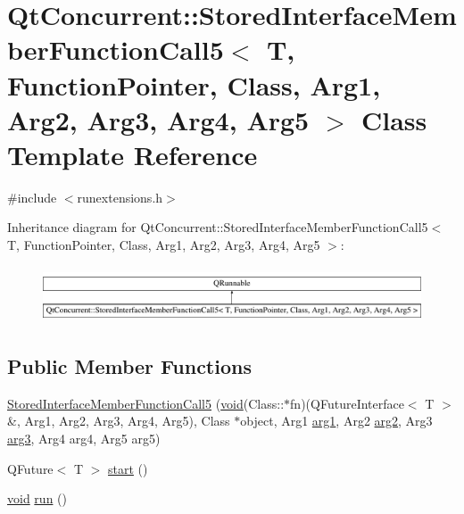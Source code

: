 \hypertarget{class_qt_concurrent_1_1_stored_interface_member_function_call5}{\section{Qt\-Concurrent\-:\-:Stored\-Interface\-Member\-Function\-Call5$<$ T, Function\-Pointer, Class, Arg1, Arg2, Arg3, Arg4, Arg5 $>$ Class Template Reference}
\label{class_qt_concurrent_1_1_stored_interface_member_function_call5}
}


{\ttfamily \#include $<$runextensions.\-h$>$}

Inheritance diagram for Qt\-Concurrent\-:\-:Stored\-Interface\-Member\-Function\-Call5$<$ T, Function\-Pointer, Class, Arg1, Arg2, Arg3, Arg4, Arg5 $>$\-:\begin{figure}[H]
\begin{center}
\leavevmode
\includegraphics[height=1.676647cm]{class_qt_concurrent_1_1_stored_interface_member_function_call5}
\end{center}
\end{figure}
\subsection*{Public Member Functions}
\begin{DoxyCompactItemize}
\item 
\hyperlink{class_qt_concurrent_1_1_stored_interface_member_function_call5_aa9068fc355a02ff4a4d4ac9f72644d60}{Stored\-Interface\-Member\-Function\-Call5} (\hyperlink{group___u_a_v_objects_plugin_ga444cf2ff3f0ecbe028adce838d373f5c}{void}(Class\-::$\ast$fn)(Q\-Future\-Interface$<$ T $>$ \&, Arg1, Arg2, Arg3, Arg4, Arg5), Class $\ast$object, Arg1 \hyperlink{glext_8h_a4b247ab422408c1761a36f9034c2585b}{arg1}, Arg2 \hyperlink{glext_8h_a5aee5a44bf92a9837fea48e41ef0df57}{arg2}, Arg3 \hyperlink{glext_8h_a525a52cc20e1aa70741e5c7dae172f25}{arg3}, Arg4 arg4, Arg5 arg5)
\item 
Q\-Future$<$ T $>$ \hyperlink{class_qt_concurrent_1_1_stored_interface_member_function_call5_a7f9d0a08cd8d984e8751f4146e0ea44c}{start} ()
\item 
\hyperlink{group___u_a_v_objects_plugin_ga444cf2ff3f0ecbe028adce838d373f5c}{void} \hyperlink{class_qt_concurrent_1_1_stored_interface_member_function_call5_a6eecfe6d0aad4cfa06c09882b83c04a4}{run} ()
\end{DoxyCompactItemize}


